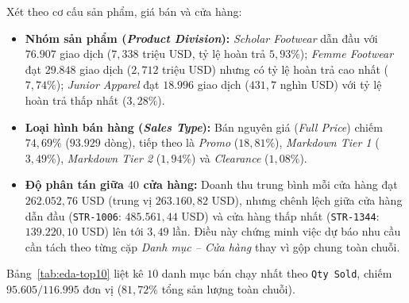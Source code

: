 Xét theo cơ cấu sản phẩm, giá bán và cửa hàng:
\begin{itemize}[topsep=0pt, itemsep=1pt]
	\item \textbf{Nhóm sản phẩm (\textit{Product Division}):} \textit{Scholar Footwear} dẫn đầu với $76.907$ giao dịch ($7{,}338$ triệu USD, tỷ lệ hoàn trả $5{,}93\%$); \textit{Femme Footwear} đạt $29.848$ giao dịch ($2{,}712$ triệu USD) nhưng có tỷ lệ hoàn trả cao nhất ($7{,}74\%$); \textit{Junior Apparel} đạt $18.996$ giao dịch ($431{,}7$ nghìn USD) với tỷ lệ hoàn trả thấp nhất ($3{,}28\%$).
	\item \textbf{Loại hình bán hàng (\textit{Sales Type}):} Bán nguyên giá (\textit{Full Price}) chiếm $74{,}69\%$ ($93.929$ dòng), tiếp theo là \textit{Promo} ($18{,}81\%$), \textit{Markdown Tier 1} ($3{,}49\%$), \textit{Markdown Tier 2} ($1{,}94\%$) và \textit{Clearance} ($1{,}08\%$).
	\item \textbf{Độ phân tán giữa $40$ cửa hàng:} Doanh thu trung bình mỗi cửa hàng đạt $262.052{,}76$ USD (trung vị $263.160{,}82$ USD), nhưng chênh lệch giữa cửa hàng dẫn đầu (\texttt{STR-1006}: $485.561{,}44$ USD) và cửa hàng thấp nhất (\texttt{STR-1344}: $139.220{,}10$ USD) lên tới $3{,}49$ lần. Điều này chứng minh việc dự báo nhu cầu cần tách theo từng cặp \textit{Danh mục -- Cửa hàng} thay vì gộp chung toàn chuỗi.
\end{itemize}
Bảng~\ref{tab:eda-top10} liệt kê $10$ danh mục bán chạy nhất theo \texttt{Qty Sold}, chiếm $95.605 / 116.995$ đơn vị ($81{,}72\%$ tổng sản lượng toàn chuỗi).
